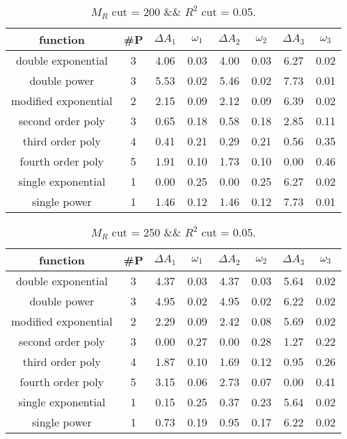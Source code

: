  
\begin{table}[H] 
\begin{center} 
\begin{tabular}{|c|c|cc|cc|cc|} 
\hline function & \#P & $\Delta A_1$ & $\omega_1$ & $\Delta A_2$ & $\omega_2$ & $\Delta A_3$ & $\omega_3$ \\ \hline 
double exponential &  3 &   4.06 &   0.03 &   4.00 &   0.03 &   6.27 &   0.02 \\ 
double power &  3 &   5.53 &   0.02 &   5.46 &   0.02 &   7.73 &   0.01 \\ 
modified exponential &  2 &   2.15 &   0.09 &   2.12 &   0.09 &   6.39 &   0.02 \\ 
second order poly &  3 &   0.65 &   0.18 &   0.58 &   0.18 &   2.85 &   0.11 \\ 
third order poly &  4 &   0.41 &   0.21 &   0.29 &   0.21 &   0.56 &   0.35 \\ 
fourth order poly &  5 &   1.91 &   0.10 &   1.73 &   0.10 &   0.00 &   0.46 \\ 
single exponential &  1 &   0.00 &   0.25 &   0.00 &   0.25 &   6.27 &   0.02 \\ 
single power &  1 &   1.46 &   0.12 &   1.46 &   0.12 &   7.73 &   0.01 \\ 
\hline 
\end{tabular} 
\caption{$M_R$ cut = 200 \&\& $R^2$ cut = 0.05.} 
\label{tab:FitChoices_200_0.05} 
\end{center} 
\end{table} 
 
 
\begin{table}[H] 
\begin{center} 
\begin{tabular}{|c|c|cc|cc|cc|} 
\hline function & \#P & $\Delta A_1$ & $\omega_1$ & $\Delta A_2$ & $\omega_2$ & $\Delta A_3$ & $\omega_3$ \\ \hline 
double exponential &  3 &   4.37 &   0.03 &   4.37 &   0.03 &   5.64 &   0.02 \\ 
double power &  3 &   4.95 &   0.02 &   4.95 &   0.02 &   6.22 &   0.02 \\ 
modified exponential &  2 &   2.29 &   0.09 &   2.42 &   0.08 &   5.69 &   0.02 \\ 
second order poly &  3 &   0.00 &   0.27 &   0.00 &   0.28 &   1.27 &   0.22 \\ 
third order poly &  4 &   1.87 &   0.10 &   1.69 &   0.12 &   0.95 &   0.26 \\ 
fourth order poly &  5 &   3.15 &   0.06 &   2.73 &   0.07 &   0.00 &   0.41 \\ 
single exponential &  1 &   0.15 &   0.25 &   0.37 &   0.23 &   5.64 &   0.02 \\ 
single power &  1 &   0.73 &   0.19 &   0.95 &   0.17 &   6.22 &   0.02 \\ 
\hline 
\end{tabular} 
\caption{$M_R$ cut = 250 \&\& $R^2$ cut = 0.05.} 
\label{tab:FitChoices_250_0.05} 
\end{center} 
\end{table} 
 
